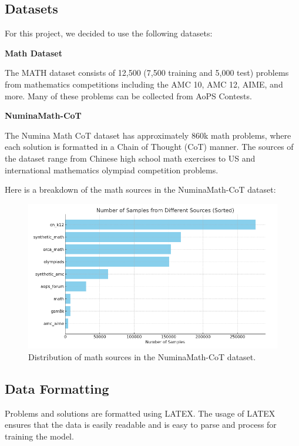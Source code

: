 \documentclass{article}
\begin{document}
\subsection{Datasets}

For this project, we decided to use the following datasets:

{\bf Math Dataset}

The MATH dataset \cite{hendrycksmath2021} consists of 12,500 (7,500 training and 5,000 test) problems from mathematics competitions including the AMC 10, AMC 12, AIME, and more. Many of these problems can be collected from AoPS Contests. \cite{aops_contests}

{\bf NuminaMath-CoT}

The Numina Math CoT dataset has approximately 860k math problems, where each solution is formatted in a Chain of Thought (CoT) manner. The sources of the dataset range from Chinese high school math exercises to US and international mathematics olympiad competition problems.
\cite{numina_math_datasets_CoT}

Here is a breakdown of the math sources in the NuminaMath-CoT dataset:

\begin{figure}[H]
  \centering
  \includegraphics[scale=0.6]{./figures/math_sources.png}
  \caption{Distribution of math sources in the NuminaMath-CoT dataset.}
  \label{fig:math-sources}
\end{figure}


\subsection{Data Formatting}

Problems and solutions are formatted using LATEX. The usage of LATEX ensures that the data is easily readable and is easy to parse and process for training the model.
\end{document}
